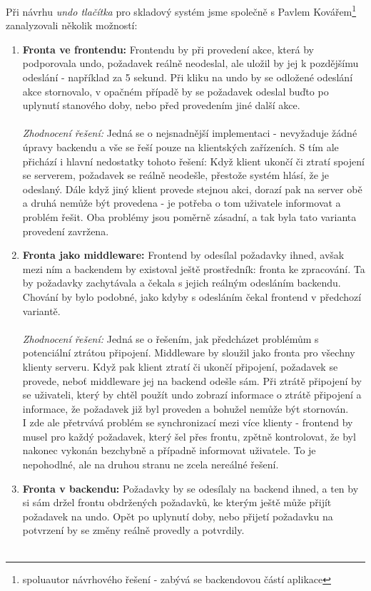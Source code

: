 Při návrhu \emph{undo tlačítka} pro skladový systém jsme společně s Pavlem Kovářem\footnote{spoluautor návrhového řešení - zabývá se backendovou částí aplikace} zanalyzovali několik možností:
\begin{enumerate}
	\item \textbf{Fronta ve frontendu:} Frontendu by při provedení akce, která by podporovala undo, požadavek reálně neodeslal, ale uložil by jej k pozdějšímu odeslání - například za 5 sekund. Při kliku na undo by se odložené odeslání akce stornovalo, v opačném případě by se požadavek odeslal buďto po uplynutí stanového doby, nebo před provedením jiné další akce.\\\\
	\emph{Zhodnocení řešení:} Jedná se o nejsnadnější implementaci - nevyžaduje žádné úpravy backendu a vše se řeší pouze na klientských zařízeních. S tím ale přichází i hlavní nedostatky tohoto řešení: Když klient ukončí či ztratí spojení se serverem, požadavek se reálně neodešle, přestože systém hlásí, že je odeslaný. Dále když jiný klient provede stejnou akci, dorazí pak na server obě a druhá nemůže být provedena - je potřeba o tom uživatele informovat a problém řešit. Oba problémy jsou poměrně zásadní, a tak byla tato varianta provedení zavržena.
	\item \textbf{Fronta jako middleware:} Frontend by odesílal požadavky ihned, avšak mezi ním a backendem by existoval ještě prostředník: fronta ke zpracování. Ta by požadavky zachytávala a čekala s jejich reálným odesláním backendu. Chování by bylo podobné, jako kdyby s odesláním čekal frontend v předchozí variantě.\\\\
	\emph{Zhodnocení řešení:} Jedná se o řešením, jak předcházet problémům s potenciální ztrátou připojení. Middleware by sloužil jako fronta pro všechny klienty serveru. Když pak klient ztratí či ukončí připojení, požadavek se provede, neboť middleware jej na backend odešle sám. Při ztrátě připojení by se uživateli, který by chtěl použít undo zobrazí informace o ztrátě připojení a informace, že požadavek již byl proveden a bohužel nemůže být stornován.\\
	I zde ale přetrvává problém se synchronizací mezi více klienty - frontend by musel pro každý požadavek, který šel přes frontu, zpětně kontrolovat, že byl nakonec vykonán bezchybně a případně informovat uživatele. To je nepohodlné, ale na druhou stranu ne zcela nereálné řešení.
	\item \textbf{Fronta v backendu:} Požadavky by se odesílaly na backend ihned, a ten by si sám držel frontu obdržených požadavků, ke kterým ještě může přijít požadavek na undo. Opět po uplynutí doby, nebo přijetí požadavku na potvrzení by se změny reálně provedly a potvrdily.\\\\

\end{enumerate}
